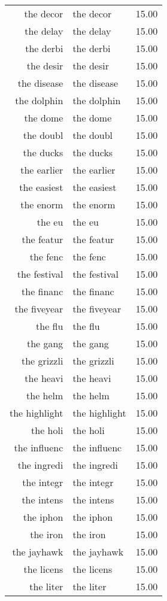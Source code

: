\begin{table}[ht]
\begin{tabular}{rlr}
  the decor & the decor & 15.00 \\ 
  the delay & the delay & 15.00 \\ 
  the derbi & the derbi & 15.00 \\ 
  the desir & the desir & 15.00 \\ 
  the disease & the disease & 15.00 \\ 
  the dolphin & the dolphin & 15.00 \\ 
  the dome & the dome & 15.00 \\ 
  the doubl & the doubl & 15.00 \\ 
  the ducks & the ducks & 15.00 \\ 
  the earlier & the earlier & 15.00 \\ 
  the easiest & the easiest & 15.00 \\ 
  the enorm & the enorm & 15.00 \\ 
  the eu & the eu & 15.00 \\ 
  the featur & the featur & 15.00 \\ 
  the fenc & the fenc & 15.00 \\ 
  the festival & the festival & 15.00 \\ 
  the financ & the financ & 15.00 \\ 
  the fiveyear & the fiveyear & 15.00 \\ 
  the flu & the flu & 15.00 \\ 
  the gang & the gang & 15.00 \\ 
  the grizzli & the grizzli & 15.00 \\ 
  the heavi & the heavi & 15.00 \\ 
  the helm & the helm & 15.00 \\ 
  the highlight & the highlight & 15.00 \\ 
  the holi & the holi & 15.00 \\ 
  the influenc & the influenc & 15.00 \\ 
  the ingredi & the ingredi & 15.00 \\ 
  the integr & the integr & 15.00 \\ 
  the intens & the intens & 15.00 \\ 
  the iphon & the iphon & 15.00 \\ 
  the iron & the iron & 15.00 \\ 
  the jayhawk & the jayhawk & 15.00 \\ 
  the licens & the licens & 15.00 \\ 
  the liter & the liter & 15.00 \\ 

\end{tabular}
\end{table}
